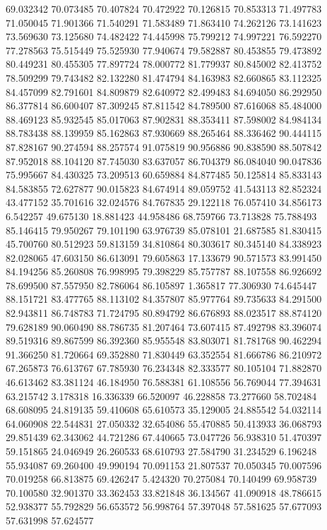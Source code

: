 69.032342
70.073485
70.407824
70.472922
70.126815
70.853313
71.497783
71.050045
71.901366
71.540291
71.583489
71.863410
74.262126
73.141623
73.569630
73.125680
74.482422
74.445998
75.799212
74.997221
76.592270
77.278563
75.515449
75.525930
77.940674
79.582887
80.453855
79.473892
80.449231
80.455305
77.897724
78.000772
81.779937
80.845002
82.413752
78.509299
79.743482
82.132280
81.474794
84.163983
82.660865
83.112325
84.457099
82.791601
84.809879
82.640972
82.499483
84.694050
86.292950
86.377814
86.600407
87.309245
87.811542
84.789500
87.616068
85.484000
88.469123
85.932545
85.017063
87.902831
88.353411
87.598002
84.984134
88.783438
88.139959
85.162863
87.930669
88.265464
88.336462
90.444115
87.828167
90.274594
88.257574
91.075819
90.956886
90.838590
88.507842
87.952018
88.104120
87.745030
83.637057
86.704379
86.084040
90.047836
75.995667
84.430325
73.209513
60.659884
84.877485
50.125814
85.833143
84.583855
72.627877
90.015823
84.674914
89.059752
41.543113
82.852324
43.477152
35.701616
32.024576
84.767835
29.122118
76.057410
34.856173
6.542257
49.675130
18.881423
44.958486
68.759766
73.713828
75.788493
85.146415
79.950267
79.101190
63.976739
85.078101
21.687585
81.830415
45.700760
80.512923
59.813159
34.810864
80.303617
80.345140
84.338923
82.028065
47.603150
86.613091
79.605863
17.133679
90.571573
83.991450
84.194256
85.260808
76.998995
79.398229
85.757787
88.107558
86.926692
78.699500
87.557950
82.786064
86.105897
1.365817
77.306930
74.645447
88.151721
83.477765
88.113102
84.357807
85.977764
89.735633
84.291500
82.943811
86.748783
71.724795
80.894792
86.676893
88.023517
88.874120
79.628189
90.060490
88.786735
81.207464
73.607415
87.492798
83.396074
89.519316
89.867599
86.392360
85.955548
83.803071
81.781768
90.462294
91.366250
81.720664
69.352880
71.830449
63.352554
81.666786
86.210972
67.265873
76.613767
67.785930
76.234348
82.333577
80.105104
71.882870
46.613462
83.381124
46.184950
76.588381
61.108556
56.769044
77.394631
63.215742
3.178318
16.336339
66.520097
46.228858
73.277660
58.702484
68.608095
24.819135
59.410608
65.610573
35.129005
24.885542
54.032114
64.060908
22.544831
27.050332
32.654086
55.470885
50.413933
36.068793
29.851439
62.343062
44.721286
67.440665
73.047726
56.938310
51.470397
59.151865
24.046949
26.260533
68.610793
27.584790
31.234529
6.196248
55.934087
69.260400
49.990194
70.091153
21.807537
70.050345
70.007596
70.019258
66.813875
69.426247
5.424320
70.275084
70.140499
69.958739
70.100580
32.901370
33.362453
33.821848
36.134567
41.090918
48.786615
52.938377
55.792829
56.653572
56.998764
57.397048
57.581625
57.677093
57.631998
57.624577
